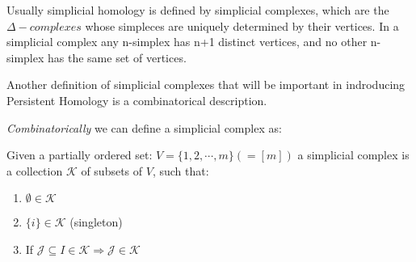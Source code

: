 \documentclass[11pt,a4paper]{report}
\begin{document}
		     Usually simplicial homology is defined by simplicial complexes, which are the $\Delta-complexes$ whose simpleces are uniquely determined by their vertices. In a simplicial complex any n-simplex has n+1 distinct vertices, and no other n-simplex has the same set of vertices. 
		     
		     Another definition of simplicial complexes that will be important in indroducing Persistent Homology is a combinatorical description. 
		     
		     \emph{Combinatorically} we can define a simplicial complex as: 
		     
		     \begin{defn}  
              Given a partially ordered set: $V = \{1, 2, \cdots, m\} (=[m])$ 
              a simplicial complex is a collection $\mathcal{K}$ of subsets of $V$, such that:\\
              \begin{enumerate}
              \item $\emptyset \in \mathcal{K}$
              \item $\{i\} \in \mathcal{K}$ (singleton)
              \item If $\mathcal{J} \subseteq I \in \mathcal{K} \Rightarrow \mathcal{J} \in \mathcal{K}$
              \end{enumerate}
		      
		     \end{defn}
\end{document}
